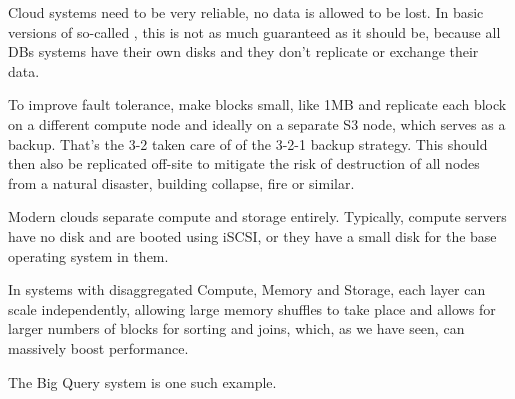 Cloud systems need to be very reliable, no data is allowed to be lost.
In basic versions of so-called , this is not as much guaranteed as it should be,
because all DBs systems have their own disks and they don't replicate or exchange their data.

To improve fault tolerance, make blocks small, like 1MB and replicate each block on a different compute node and ideally on a separate S3 node,
which serves as a backup. That's the 3-2 taken care of of the 3-2-1 backup strategy. This should then also be replicated off-site to mitigate the risk of destruction of all nodes
from a natural disaster, building collapse, fire or similar.

Modern clouds separate compute and storage entirely. Typically, compute servers have no disk and are booted using iSCSI,
or they have a small disk for the base operating system in them.

In systems with disaggregated Compute, Memory and Storage, each layer can scale independently, allowing large memory shuffles to take place and allows
for larger numbers of blocks for sorting and joins, which, as we have seen, can massively boost performance.

The Big Query system is one such example.
